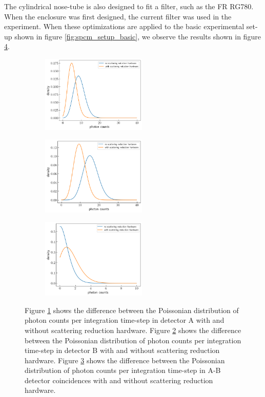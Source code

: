 \documentclass[letterpaper, 11 pt]{article}
\begin{document}
The cylindrical nose-tube is also designed to fit a filter, such as the FR
RG780. When the enclosure was first designed, the current filter was used in the
experiment. When these optimizations are applied to the basic experimental
set-up shown in figure \ref{fig:spcm_setup_basic}, we observe the results shown
in figure \ref{fig:scatter_reduce}.
\begin{figure}[H]%
    \centering
    \begin{subfigure}{.3\textwidth}
    \includegraphics[width=5cm]{ch1_scatter.png}
    \caption{ }
    \label{fig:1}
    \end{subfigure}
    \begin{subfigure}{.3\textwidth}
    \includegraphics[width = 5cm]{ch2_scatter.png}
    \caption{ }
    \label{fig:2}
    \end{subfigure}
    \begin{subfigure}{.3\textwidth}
    \includegraphics[width = 5cm]{cc_scatter.png}
    \caption{ }
    \label{fig:cc}
    \end{subfigure}
    \caption{Figure \ref{fig:1} shows the difference between the Poissonian
    distribution of photon counts per integration time-step in detector A with
    and without scattering reduction hardware. Figure \ref{fig:2} shows the
    difference between the Poissonian distribution of photon counts per
    integration time-step in detector B with and without scattering reduction
    hardware. Figure \ref{fig:cc} shows the difference between the Poissonian
    distribution of photon counts per integration time-step in A-B detector
    coincidences with and without scattering reduction hardware.}
    \label{fig:scatter_reduce}
\end{figure}
\end{document}
